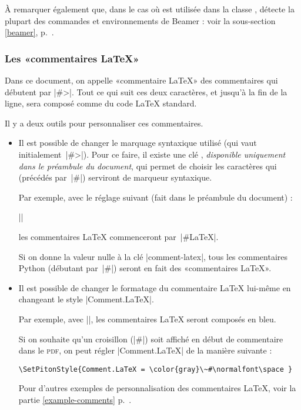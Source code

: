 \documentclass[dvipsnames,svgnames]{article}
\begin{document}
\smallskip
À remarquer également que, dans le cas où  est utilisée dans la classe
,  détecte la plupart des commandes et environnements de Beamer :
voir la sous-section \ref{beamer}, p.~\pageref{beamer}.



\subsubsection{Les «commentaires LaTeX»}


Dans ce document, on appelle «commentaire LaTeX» des commentaires qui débutent par |#>|.
Tout ce qui suit ces deux caractères, et jusqu'à la fin de la ligne, sera composé comme du
code LaTeX standard.

Il y a deux outils pour personnaliser ces commentaires.

\begin{itemize}
\item Il est possible de changer le marquage syntaxique utilisé (qui vaut
initialement~|#>|). Pour ce faire, il existe une clé ,
\emph{disponible uniquement dans le préambule du document}, qui permet de choisir les
caractères qui (précédés par~|#|) serviront de marqueur syntaxique.

Par exemple, avec le réglage suivant (fait dans le préambule du document) :

||

les commentaires LaTeX commenceront par~|#LaTeX|.

Si on donne la valeur nulle à la clé |comment-latex|, tous les commentaires Python
(débutant par~|#|) seront en fait des «commentaires LaTeX».

\smallskip
\item Il est possible de changer le formatage du commentaire LaTeX lui-même en changeant
le style  |Comment.LaTeX|.

Par exemple, avec ||, les
commentaires LaTeX seront composés en bleu.

Si on souhaite qu'un croisillon (|#|) soit affiché en début de commentaire dans le
\textsc{pdf}, on peut régler |Comment.LaTeX| de la manière suivante :

\begin{Verbatim}
\SetPitonStyle{Comment.LaTeX = \color{gray}\~#\normalfont\space }
\end{Verbatim}

Pour d'autres exemples de personnalisation des commentaires LaTeX, voir la partie \ref{example-comments}
p.~\pageref{example-comments}. 
\end{itemize}
\end{document}
